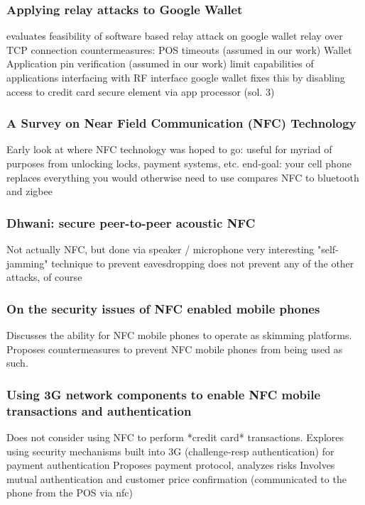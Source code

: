 \subsubsection*{Applying relay attacks to Google Wallet}
\cite{roland2013applying}
evaluates feasibility of software based relay attack on google wallet
relay over TCP connection
countermeasures:
  POS timeouts (assumed in our work)
  Wallet Application pin verification (assumed in our work)
  limit capabilities of applications interfacing with RF interface
google wallet fixes this by disabling access to credit card secure element via app processor (sol. 3)

\subsubsection*{A Survey on Near Field Communication (NFC) Technology}
\cite{Coskun2013}
Early look at where NFC technology was hoped to go:
useful for myriad of purposes from unlocking locks, payment systems, etc.
end-goal: your cell phone replaces everything you would otherwise need to use
compares NFC to bluetooth and zigbee

\subsubsection*{Dhwani: secure peer-to-peer acoustic NFC}
\cite{nandakumar2013dhwani}
Not actually NFC, but done via speaker / microphone
very interesting "self-jamming" technique to prevent eavesdropping
does not prevent any of the other attacks, of course

\subsubsection*{On the security issues of NFC enabled mobile phones}
\cite{francis2010security}
Discusses the ability for NFC mobile phones to operate as skimming platforms.
Proposes countermeasures to prevent NFC mobile phones from being used as such.

\subsubsection*{Using 3G network components to enable NFC mobile transactions and authentication}
\cite{chen2010using}
Does not consider using NFC to perform *credit card* transactions.
Explores using security mechanisms built into 3G (challenge-resp authentication) for payment authentication
Proposes payment protocol, analyzes risks
Involves mutual authentication and customer price confirmation (communicated to the phone from the POS via nfc)
